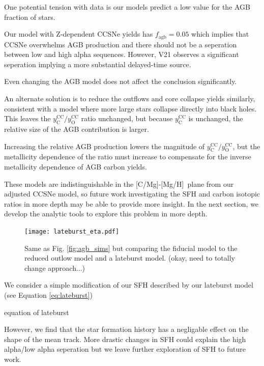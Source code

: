 \documentclass[12pt,oneside]{report}
\newcommand{\caah}{[C/Mg]-[Mg/H]}
\begin{document}
One potential tension with data is our models predict a low value for the AGB fraction of stars. 

Our model with Z-dependent CCSNe yields has $f_\text{agb} = 0.05$ which implies that CCSNe overwhelms AGB production and there should not be a seperation between low and high alpha sequences. However, V21 observes a significant seperation implying a more substantial delayed-time source. 

Even changing the AGB model does not affect the conclusion significantly. 

An alternate solution is to reduce the outflows and core collapse yields similarly, consistent with a model where more large stars collapse directly into black holes. This leaves the $y_\text{C}^\text{CC}/y_\text{O}^\text{CC}$ ratio unchanged, but because $y_\text{C}^\text{CC}$ is unchanged, the relative size of the AGB contribution is larger. 


Increasing the relative AGB production lowers the magnitude of  $y_\text{C}^\text{CC}/y_\text{O}^\text{CC}$, but the metallicity dependence of the ratio must increase to compensate for the inverse metallicity dependence of AGB carbon yields. 

These models are indistinguishable in the \caah~plane from our adjusted CCSNe model, so future work investigating the SFH and carbon isotopic ratios in more depth may be able to provide more insight. In the next section, we develop the analytic tools to explore this problem in more depth. 




\begin{figure}
\centering
\texttt{[image: lateburst\_eta.pdf]}

\caption[Lateburst and reduced-outflow models]{Same as Fig. \ref{fig:agb_sims} but comparing the fiducial model to the reduced outlow model and a lateburst model. (okay, need to totally change approach...)}
\end{figure}

We consider a simple modification of our SFH described by our lateburst model
(see Equation \ref{eq:lateburst})

equation of lateburst

However, we find that the star formation history has a negligable effect on the shape of the mean track. More drastic changes in SFH could explain the high alpha/low alpha seperation but we leave further exploration of SFH to future work. 
\end{document}
